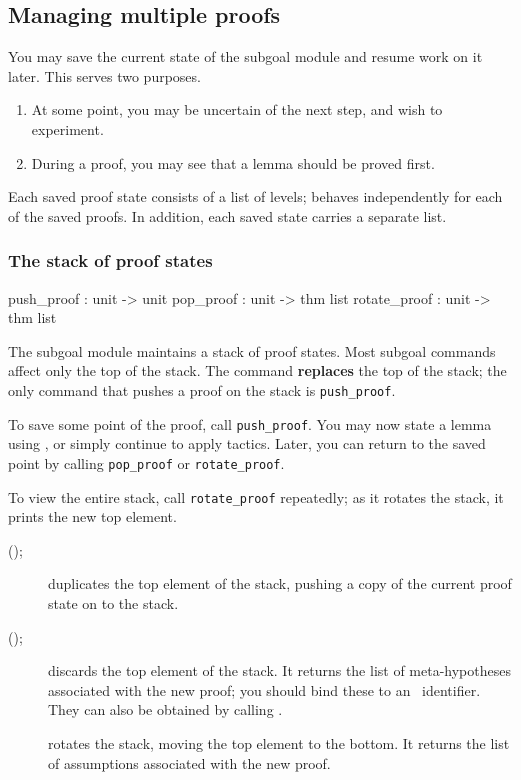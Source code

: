 \subsection{Managing multiple proofs}
You may save the current state of the subgoal module and resume work on it
later.  This serves two purposes.  
\begin{enumerate}
\item At some point, you may be uncertain of the next step, and
wish to experiment.

\item During a proof, you may see that a lemma should be proved first.
\end{enumerate}
Each saved proof state consists of a list of levels;  behaves
independently for each of the saved proofs.  In addition, each saved state
carries a separate  list.

\subsubsection{The stack of proof states}
\begin{ttbox} 
push_proof   : unit -> unit
pop_proof    : unit -> thm list
rotate_proof : unit -> thm list
\end{ttbox}
The subgoal module maintains a stack of proof states.  Most subgoal
commands affect only the top of the stack.  The  command {\bf
replaces} the top of the stack; the only command that pushes a proof on the
stack is {\tt push_proof}.

To save some point of the proof, call {\tt push_proof}.  You may now
state a lemma using , or simply continue to apply tactics.
Later, you can return to the saved point by calling {\tt pop_proof} or 
{\tt rotate_proof}. 

To view the entire stack, call {\tt rotate_proof} repeatedly; as it rotates
the stack, it prints the new top element.

\begin{description}
\item[();]  
duplicates the top element of the stack, pushing a copy of the current
proof state on to the stack.

\item[();]  
discards the top element of the stack.  It returns the list of
meta-hypotheses associated with the new proof;  you should bind these to an
\ML\ identifier.  They can also be obtained by calling .

\item[]  
rotates the stack, moving the top element to the bottom.  It returns the
list of assumptions associated with the new proof.
\end{description}


